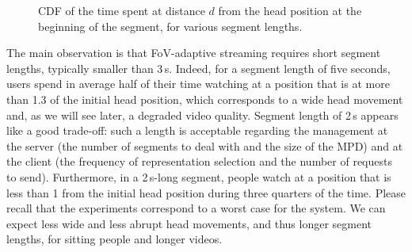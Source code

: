 \begin{figure}[htbp]
\centering

\caption{CDF of the time spent at distance $d$ from the head position at the beginning of the
segment, for various segment lengths.}\label{cdf-dataset}
\end{figure}

The main observation is that FoV-adaptive streaming requires short segment lengths, typically
smaller than 3\,s. Indeed, for a segment length of five seconds,
users spend in average half of their time watching at a position that is at more than
1.3 of the initial head position,
which corresponds to a wide head movement and, as we will see later, a degraded video quality.
Segment length of 2\,s appears like a good trade-off: such a length is acceptable regarding the
management at the server (the number of segments to deal with and the size of the \ac{MPD})
and at the client (the frequency of representation selection and the number of requests
to send). Furthermore, in a 2\,s-long segment, people watch
at a position that is less than 1 from the initial head position during three quarters
of the time. Please recall that the experiments correspond to a worst case for the system.
We can expect less
wide and less abrupt head movements, and thus longer segment lengths, for sitting
people and longer videos.

